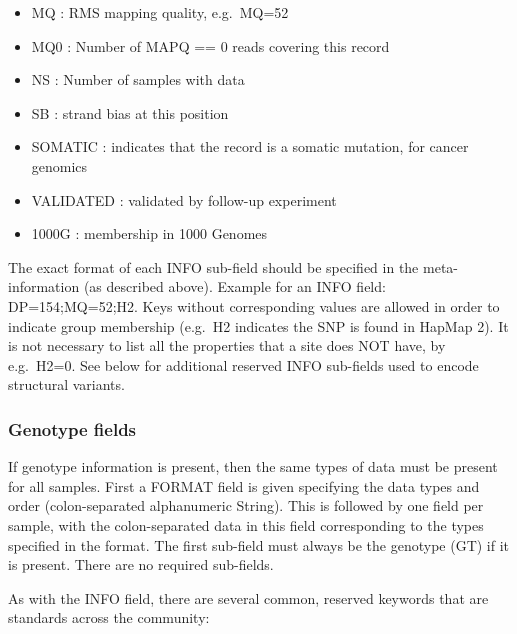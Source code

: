 \documentclass[8pt]{article}
\begin{document}
\begin{enumerate}
\begin{itemize}
  \item MQ : RMS mapping quality, e.g.\ MQ=52
  \item MQ0 : Number of MAPQ == 0 reads covering this record
  \item NS : Number of samples with data
  \item SB : strand bias at this position
  \item SOMATIC : indicates that the record is a somatic mutation, for cancer genomics
  \item VALIDATED : validated by follow-up experiment
  \item 1000G : membership in 1000 Genomes
\end{itemize}
\end{enumerate}
The exact format of each INFO sub-field should be specified in the meta-information (as described above).
Example for an INFO field: DP=154;MQ=52;H2. Keys without corresponding values are allowed in order to indicate group membership (e.g.\ H2 indicates the SNP is found in HapMap 2). It is not necessary to list all the properties that a site does NOT have, by e.g.\ H2=0. See below for additional reserved INFO sub-fields used to encode structural variants.
\subsubsection{Genotype fields}
If genotype information is present, then the same types of data must be present for all samples. First a FORMAT field is given specifying the data types and order (colon-separated alphanumeric String). This is followed by one field per sample, with the colon-separated data in this field corresponding to the types specified in the format. The first sub-field must always be the genotype (GT) if it is present.  There are no required sub-fields.

As with the INFO field, there are several common, reserved keywords that are standards across the community:
\end{document}
